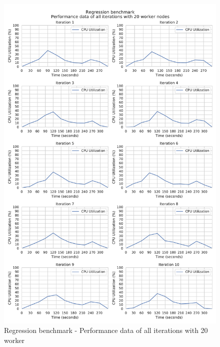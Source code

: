\begin{figure}[h]
\centering
\includegraphics[scale=0.5]{images/appendix/evaluation_data/regression_benchmark/regression_20_worker_cpu_performance}
\caption{Regression benchmark - Performance data of all iterations with 20 worker}
\label{fig:appendix_eval_regression_static20}
\end{figure}

